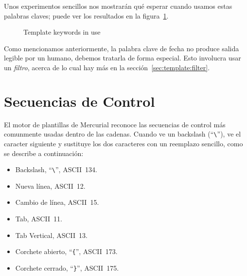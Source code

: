 Unos experimentos sencillos nos mostrarán qué esperar cuando usamos
estas palabras claves; puede ver los resultados en la
figura~\ref{fig:template:keywords}.

\begin{figure}
  \caption{Template keywords in use}
  \label{fig:template:keywords}
\end{figure}

Como mencionamos anteriormente, la palabra clave de fecha no produce
salida legible por un humano, debemos tratarla de forma especial.
Esto involucra usar un \emph{filtro}, acerca de lo cual hay más en la
sección~\ref{sec:template:filter}.


\section{Secuencias de Control}
\label{sec:template:escape}

El motor de plantillas de Mercurial reconoce las secuencias de control
más comunmente usadas dentro de las cadenas.  Cuando ve un backslash
(``\Verb+\+''), ve el caracter siguiente y sustituye los dos
caracteres con un reemplazo sencillo, como se describe a continuación:

\begin{itemize}
\item[\Verb+\textbackslash\textbackslash+] Backslash, ``\Verb+\+'',
  ASCII~134.
\item[\Verb+\textbackslash n+] Nueva línea, ASCII~12.
\item[\Verb+\textbackslash r+] Cambio de línea, ASCII~15.
\item[\Verb+\textbackslash t+] Tab, ASCII~11.
\item[\Verb+\textbackslash v+] Tab Vertical, ASCII~13.
\item[\Verb+\textbackslash \{+] Corchete abierto, ``\Verb+{+'', ASCII~173.
\item[\Verb+\textbackslash \}+] Corchete cerrado, ``\Verb+}+'', ASCII~175.
\end{itemize}

